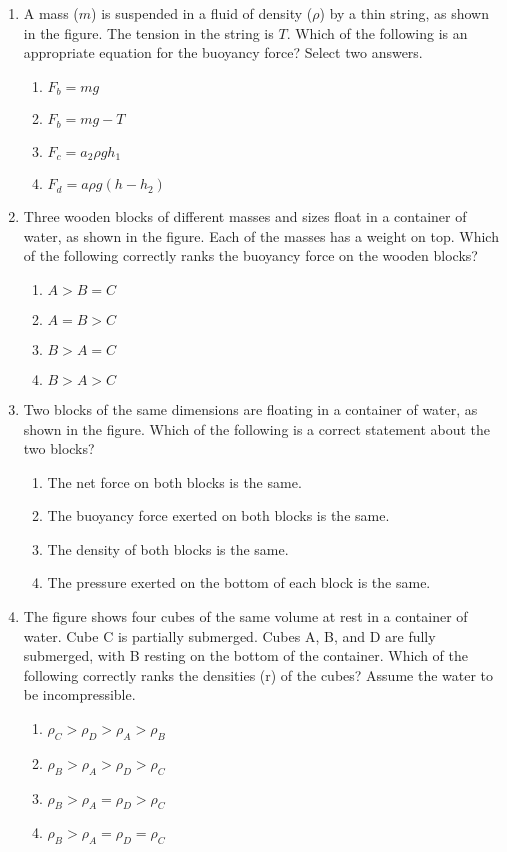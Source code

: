 \documentclass{../../oss-apphys}
\begin{document}
\begin{multicols}{2}
\begin{enumerate}[leftmargin=18pt,start=3]
  \item A mass ($m$) is suspended in a fluid of density ($\rho$) by a thin
    string, as shown in the figure. The tension in the string is $T$. Which of
    the following is an appropriate equation for the buoyancy force? Select
    two answers.
    \begin{enumerate}[noitemsep,topsep=0pt,leftmargin=18pt,label=(\Alph*)]
    \item $F_b=mg$
    \item $F_b=mg-T$
    \item $F_c=a_2 \rho gh_1$
    \item $F_d=a\rho g(h-h_2)$
    \end{enumerate}
    
  \item Three wooden blocks of different masses and sizes float in a container
    of water, as shown in the figure. Each of the masses has a weight on top.
    Which of the following correctly ranks the buoyancy force on the wooden
    blocks?
    \begin{enumerate}[noitemsep,topsep=0pt,leftmargin=18pt,label=(\Alph*)]
    \item $A > B = C$
    \item $A = B > C$
    \item $B > A = C$
    \item $B > A > C$
    \end{enumerate}
    
  \item Two blocks of the same dimensions are floating in a container of
    water, as shown in the figure. Which of the following is a correct
    statement about the two blocks?
    \begin{enumerate}[noitemsep,topsep=0pt,leftmargin=18pt,label=(\Alph*)]
    \item The net force on both blocks is the same.
    \item The buoyancy force exerted on both blocks is the same.
    \item The density of both blocks is the same.
    \item The pressure exerted on the bottom of each block is the same.
    \end{enumerate}
    
  \item The figure shows four cubes of the same volume at rest in a container
    of water. Cube C is partially submerged. Cubes A, B, and D are fully
    submerged, with B resting on the bottom of the container. Which of
    the following correctly ranks the densities (r) of the cubes? Assume
    the water to be incompressible.
    \begin{enumerate}[noitemsep,topsep=0pt,leftmargin=18pt,label=(\Alph*)]
    \item $\rho_C >\rho_D >\rho_A >\rho_B$
    \item $\rho_B >\rho_A >\rho_D >\rho_C$
    \item $\rho_B >\rho_A =\rho_D >\rho_C$
    \item $\rho_B >\rho_A =\rho_D =\rho_C$
    \end{enumerate}


\end{enumerate}
\end{multicols}
\end{document}

